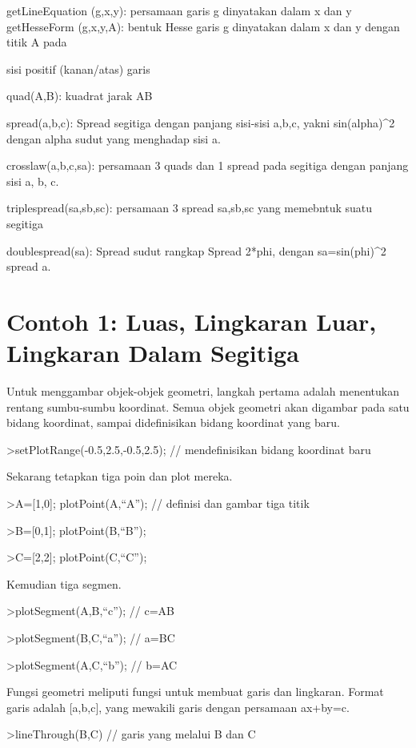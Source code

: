 \documentclass[
]{book}
\begin{document}
getLineEquation (g,x,y): persamaan garis g dinyatakan dalam x dan y\\
getHesseForm (g,x,y,A): bentuk Hesse garis g dinyatakan dalam x dan y dengan titik A pada

sisi positif (kanan/atas) garis

quad(A,B): kuadrat jarak AB

spread(a,b,c): Spread segitiga dengan panjang sisi-sisi a,b,c, yakni sin(alpha)\^{}2 dengan alpha sudut yang menghadap sisi a.

crosslaw(a,b,c,sa): persamaan 3 quads dan 1 spread pada segitiga dengan panjang sisi a, b, c.

triplespread(sa,sb,sc): persamaan 3 spread sa,sb,sc yang memebntuk suatu segitiga

doublespread(sa): Spread sudut rangkap Spread 2*phi, dengan sa=sin(phi)\^{}2 spread a.

\section{Contoh 1: Luas, Lingkaran Luar, Lingkaran Dalam Segitiga}\label{contoh-1-luas-lingkaran-luar-lingkaran-dalam-segitiga}

Untuk menggambar objek-objek geometri, langkah pertama adalah menentukan rentang sumbu-sumbu koordinat. Semua objek geometri akan digambar pada satu bidang koordinat, sampai didefinisikan bidang koordinat yang baru.

\textgreater setPlotRange(-0.5,2.5,-0.5,2.5); // mendefinisikan bidang koordinat baru

Sekarang tetapkan tiga poin dan plot mereka.

\textgreater A={[}1,0{]}; plotPoint(A,``A''); // definisi dan gambar tiga titik

\textgreater B={[}0,1{]}; plotPoint(B,``B'');

\textgreater C={[}2,2{]}; plotPoint(C,``C'');

Kemudian tiga segmen.

\textgreater plotSegment(A,B,``c''); // c=AB

\textgreater plotSegment(B,C,``a''); // a=BC

\textgreater plotSegment(A,C,``b''); // b=AC

Fungsi geometri meliputi fungsi untuk membuat garis dan lingkaran. Format garis adalah {[}a,b,c{]}, yang mewakili garis dengan persamaan ax+by=c.

\textgreater lineThrough(B,C) // garis yang melalui B dan C
\end{document}
